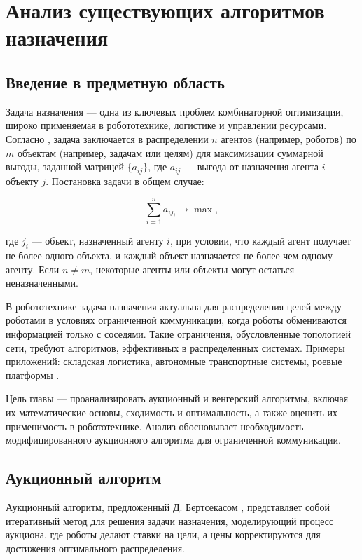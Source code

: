 \chapter{Анализ существующих алгоритмов назначения}
\label{ch:analysis}

\section{Введение в предметную область}
Задача назначения --- одна из ключевых проблем комбинаторной оптимизации, широко применяемая в робототехнике, логистике и управлении ресурсами. Согласно \cite{bertsekas1990}, задача заключается в распределении \( n \) агентов (например, роботов) по \( m \) объектам (например, задачам или целям) для максимизации суммарной выгоды, заданной матрицей \( \{a_{ij}\} \), где \( a_{ij} \) --- выгода от назначения агента \( i \) объекту \( j \). Постановка задачи в общем случае:

\[
\sum_{i=1}^n a_{i j_i} \to \max,
\]

где \( j_i \) --- объект, назначенный агенту \( i \), при условии, что каждый агент получает не более одного объекта, и каждый объект назначается не более чем одному агенту. Если \( n \neq m \), некоторые агенты или объекты могут остаться неназначенными.

В робототехнике задача назначения актуальна для распределения целей между роботами в условиях ограниченной коммуникации, когда роботы обмениваются информацией только с соседями. Такие ограничения, обусловленные топологией сети, требуют алгоритмов, эффективных в распределенных системах. Примеры приложений: складская логистика, автономные транспортные системы, роевые платформы \cite{kalyaev2009, gerkey2003}.

Цель главы --- проанализировать аукционный и венгерский алгоритмы, включая их математические основы, сходимость и оптимальность, а также оценить их применимость в робототехнике. Анализ обосновывает необходимость модифицированного аукционного алгоритма для ограниченной коммуникации.


\section{Аукционный алгоритм}
Аукционный алгоритм, предложенный Д. Бертсекасом \cite{bertsekas1990}, представляет собой итеративный метод для решения задачи назначения, моделирующий процесс аукциона, где роботы делают ставки на цели, а цены корректируются для достижения оптимального распределения.

